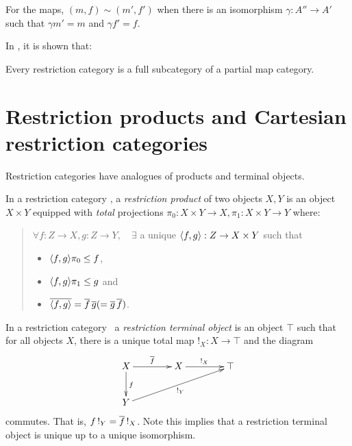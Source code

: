 For the maps, $(m,f) \sim (m',f')$ when there is an isomorphism $\gamma : A'' \to A'$
such that $\gamma m' = m$ and $\gamma f' = f$.

In \cite{cockettlack2003:restcategories2}, it is shown that:
\begin{theorem}
  Every restriction category is a full subcategory of a partial map category.
\end{theorem}
\section{Restriction products and Cartesian restriction categories} %
\label{sub:restriction_products_and_cartesian_restriction_categories}


Restriction categories have analogues of products and terminal objects.

\begin{definition}\label{def:restriction_product}
  In a restriction category \X, a \emph{restriction product}  of two objects $X, Y$ is an
  object $X\times Y$ equipped with \emph{total} projections
  $\pi_0:X\times Y\to X, \pi_1:X\times Y\to Y $ where:
  \begin{quote}
    $\forall f:Z\to X, g: Z\to Y, \quad \exists$ a unique $\langle f,g\rangle:Z \to X\times Y$ such that
    \begin{itemize}
      \item $\langle f,g\rangle \pi_0 \le f$,
      \item $\langle f,g\rangle \pi_1 \le g$ and
      \item $\overline{\langle f,g\rangle} = \overline{f}\, \overline{g} ( = \overline{g}\, \overline{f})$.
    \end{itemize}
  \end{quote}
\end{definition}

\begin{definition}\label{def:restriction_terminal_object}
  In a restriction category \X\, a \emph{restriction terminal object}
  is an object $\top$ such that for all objects $X$, there is a
  unique total map $!_X : X \to \top$ and the diagram
  \[
    \xymatrix @C=40pt @R=25pt{
      X \ar[r]^{\restr{f}} \ar[d]^{f} & X \ar[r]^{!_X}  &\top  \\
      Y \ar[urr]_{!_Y}
    }
  \]
  commutes. That is,  $f\, !_Y = \overline{f}\, !_X$. Note this implies
  that a restriction terminal object is unique up to a unique isomorphism.
\end{definition}

